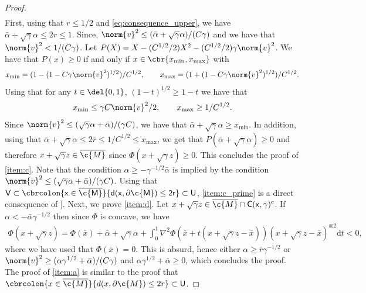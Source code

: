 \begin{proof}
\begin{align}
	\end{align}
	First, using that $r\leq 1/2$ and \eqref{eq:consequence_upper}, we have $\bar{\alpha} + \sqrt{\gamma}\alpha \leq 2r \leq 1$.
	Since, $\norm{v}^2 \leq (\bar{\alpha} +\sqrt{\gamma} \alpha)/(C\gamma)$ and we have that $\norm{v}^2 < 1/(C \gamma)$.
	Let $P(X) = X - (C^{1/2}/2)X^2 - (C^{1/2}/2)\gamma\norm{v}^2$.
	We have that $P(x) \geq 0$ if and only if $x \in \cbr{x_{\min}, x_{\max}}$ with \begin{equation} x_{\min} = (1 -(1 -C\gamma \norm{v}^2)^{1/2})/C^{1/2}, \qquad x_{\max} = (1 +(1 -C\gamma \norm{v}^2)^{1/2})/C^{1/2}.
	\end{equation}
	Using that for any $t \in \del{0,1}$, $(1-t)^{1/2} \geq 1 - t$ we have that \begin{equation} x_{\min} \leq \gamma C \norm{v}^2/2 , \qquad x_{\max} \geq 1/C^{1/2} .
	\end{equation}
	Since $\norm{v}^2 \leq (\sqrt{\gamma} \alpha + \bar{\alpha})/(\gamma C)$, we have that $\bar{\alpha} + \sqrt{\gamma} \alpha \geq x_{\min}$.
	In addition, using that $\bar{\alpha} + \sqrt{\gamma} \alpha \leq 2 \bar{r} \leq 1/C^{1/2} \leq x_{\mathrm{max}}$, we get that $P(\bar{\alpha} + \sqrt{\gamma}\alpha) \geq 0$ and therefore $x + \sqrt{\gamma}z \in \cl{\c{M}}$ since $\Phi(x+ \sqrt{\gamma}z) \geq 0$.
	This concludes the proof of \ref{item:c}.
	Note that the condition $\alpha \geq -\gamma^{-1/2} \bar{\alpha}$ is implied by the condition $\norm{v}^2 \leq (\sqrt{\gamma} \alpha + \bar{\alpha})/(\gamma C)$.
	Using that $\sf{V} \subset \cbrcolon{x \in \cl{\c{M}}}{d(x,\partial \c{M}) \leq 2r} \subset \sf{U}$, \ref{item:c_prime} is a direct consequence of \cite[Theorem 6.24]{lee2013smooth}].
	Next, we prove \ref{item:d}.
	Let $x + \sqrt{\gamma}z \in \cl{\c{M}} \cap \sf{C}(x,\gamma)^\mathrm{c}$.
	If $\alpha <-\bar{\alpha}\gamma^{-1/2}$ then since $\Phi$ is concave, we have \begin{align} \Phi(x+\sqrt{\gamma}z) = \textstyle{\Phi(\bar{x}) + \bar{\alpha} + \sqrt{\gamma} \alpha + \int_0^1 \nabla^2 \Phi(\bar{x} + t(x+\sqrt{\gamma}z-\bar{x}))(x+\sqrt{\gamma}z-\bar{x})^{\otimes 2} \mathrm{d} t } < 0 , \end{align} where we have used that $\Phi(\bar{x}) = 0$.
	This is absurd, hence either $\alpha \geq \bar{r}\gamma^{-1/2}$ or $\norm{v}^2 \geq ( \alpha \gamma^{1/2} + \bar{\alpha})/(C\gamma)$ and $\alpha \gamma^{1/2} + \bar{\alpha} \geq 0$, which concludes the proof.
	The proof of \ref{item:a} is similar to the proof that $\cbrcolon{x \in \cl{\c{M}}}{d(x, \partial \c{M}) \leq 2r } \subset \sf{U}$.

\end{proof}

